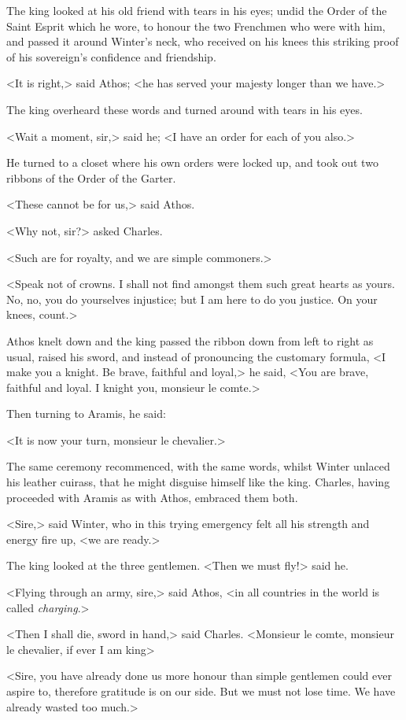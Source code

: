 The king looked at his old friend with tears in his eyes; undid the Order of the Saint Esprit which he wore, to honour the two Frenchmen who were with him, and passed it around Winter's neck, who received on his knees this striking proof of his sovereign's confidence and friendship.

<It is right,> said Athos; <he has served your majesty longer than we have.>

The king overheard these words and turned around with tears in his eyes.

<Wait a moment, sir,> said he; <I have an order for each of you also.>

He turned to a closet where his own orders were locked up, and took out two ribbons of the Order of the Garter.

<These cannot be for us,> said Athos.

<Why not, sir?> asked Charles.

<Such are for royalty, and we are simple commoners.>

<Speak not of crowns. I shall not find amongst them such great hearts as yours. No, no, you do yourselves injustice; but I am here to do you justice. On your knees, count.>

Athos knelt down and the king passed the ribbon down from left to right as usual, raised his sword, and instead of pronouncing the customary formula, <I make you a knight. Be brave, faithful and loyal,> he said, <You are brave, faithful and loyal. I knight you, monsieur le comte.>

Then turning to Aramis, he said:

<It is now your turn, monsieur le chevalier.>

The same ceremony recommenced, with the same words, whilst Winter unlaced his leather cuirass, that he might disguise himself like the king. Charles, having proceeded with Aramis as with Athos, embraced them both.

<Sire,> said Winter, who in this trying emergency felt all his strength and energy fire up, <we are ready.>

The king looked at the three gentlemen. <Then we must fly!> said he.

<Flying through an army, sire,> said Athos, <in all countries in the world is called \emph{charging}.>

<Then I shall die, sword in hand,> said Charles. <Monsieur le comte, monsieur le chevalier, if ever I am king\longdash>

<Sire, you have already done us more honour than simple gentlemen could ever aspire to, therefore gratitude is on our side. But we must not lose time. We have already wasted too much.>

